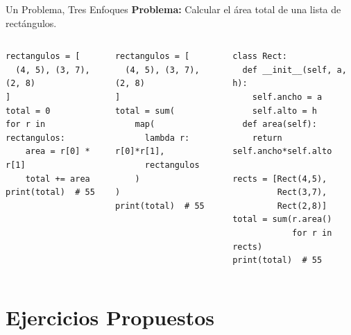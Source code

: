 \documentclass[aspectratio=169]{beamer}
\begin{document}
\begin{frame}[fragile]{Un Problema, Tres Enfoques}
    \textbf{Problema:} Calcular el área total de una lista de rectángulos.
    
    \begin{columns}
        \begin{lstlisting}[title=Imperativo,basicstyle=\ttfamily\tiny]
rectangulos = [
  (4, 5), (3, 7), (2, 8)
]
total = 0
for r in rectangulos:
    area = r[0] * r[1]
    total += area
print(total)  # 55
        \end{lstlisting}
        
        \begin{lstlisting}[title=Funcional,basicstyle=\ttfamily\tiny]
rectangulos = [
  (4, 5), (3, 7), (2, 8)
]
total = sum(
    map(
      lambda r: r[0]*r[1],
      rectangulos
    )
)
print(total)  # 55
        \end{lstlisting}
        
        \begin{lstlisting}[title=POO,basicstyle=\ttfamily\tiny]
class Rect:
  def __init__(self, a, h):
    self.ancho = a
    self.alto = h
  def area(self):
    return self.ancho*self.alto

rects = [Rect(4,5),
         Rect(3,7),
         Rect(2,8)]
total = sum(r.area() 
            for r in rects)
print(total)  # 55
        \end{lstlisting}
    \end{columns}
\end{frame}

\section{Ejercicios Propuestos}
\end{document}
